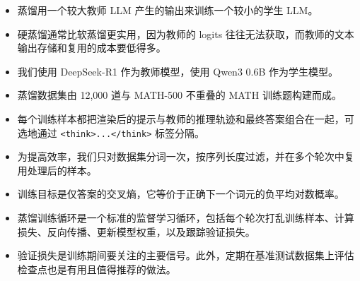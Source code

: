 \begin{itemize}
\item 蒸馏用一个较大教师 LLM 产生的输出来训练一个较小的学生 LLM。
\item 硬蒸馏通常比软蒸馏更实用，因为教师的 logits 往往无法获取，而教师的文本输出存储和复用的成本要低得多。
\item 我们使用 DeepSeek-R1 作为教师模型，使用 Qwen3 0.6B 作为学生模型。
\item 蒸馏数据集由 12,000 道与 MATH-500 不重叠的 MATH 训练题构建而成。
\item 每个训练样本都把渲染后的提示与教师的推理轨迹和最终答案组合在一起，可选地通过 \texttt{\textless{}think\textgreater{}...\textless{}/think\textgreater{}} 标签分隔。
\item 为提高效率，我们只对数据集分词一次，按序列长度过滤，并在多个轮次中复用处理后的样本。
\item 训练目标是仅答案的交叉熵，它等价于正确下一个词元的负平均对数概率。
\item 蒸馏训练循环是一个标准的监督学习循环，包括每个轮次打乱训练样本、计算损失、反向传播、更新模型权重，以及跟踪验证损失。
\item 验证损失是训练期间要关注的主要信号。此外，定期在基准测试数据集上评估检查点也是有用且值得推荐的做法。
\end{itemize}
